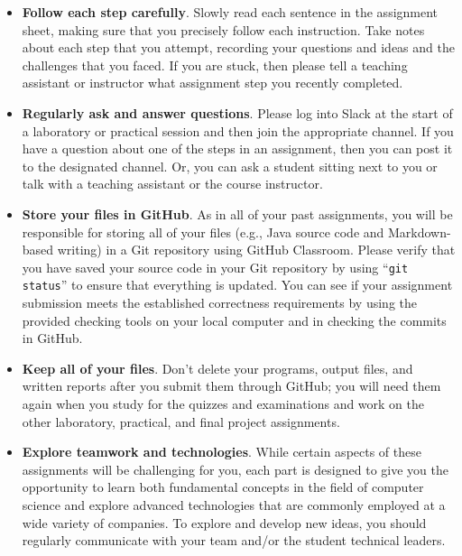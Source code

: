 \documentclass[11pt]{article}
\newcommand{\command}[1]{``\lstinline{#1}''}
\begin{document}
\begin{itemize}
  \setlength{\itemsep}{0pt}

\item {\bf Follow each step carefully}. Slowly read each sentence in the
  assignment sheet, making sure that you precisely follow each instruction.
  Take notes about each step that you attempt, recording your questions and
  ideas and the challenges that you faced. If you are stuck, then please tell a
  teaching assistant or instructor what assignment step you recently completed.

\item {\bf Regularly ask and answer questions}. Please log into Slack at the
  start of a laboratory or practical session and then join the appropriate
  channel. If you have a question about one of the steps in an assignment, then
  you can post it to the designated channel. Or, you can ask a student sitting
  next to you or talk with a teaching assistant or the course instructor.

\item {\bf Store your files in GitHub}. As in all of your past assignments, you
  will be responsible for storing all of your files (e.g., Java source code and
  Markdown-based writing) in a Git repository using GitHub Classroom. Please
  verify that you have saved your source code in your Git repository by using
  \command{git status} to ensure that everything is updated. You can see if
  your assignment submission meets the established correctness requirements by
  using the provided checking tools on your local computer and in checking the
  commits in GitHub.

\item {\bf Keep all of your files}. Don't delete your programs, output files,
  and written reports after you submit them through GitHub; you will need them
  again when you study for the quizzes and examinations and work on the other
  laboratory, practical, and final project assignments.

\item {\bf Explore teamwork and technologies}. While certain aspects of these
  assignments will be challenging for you, each part is designed to give you the
  opportunity to learn both fundamental concepts in the field of computer
  science and explore advanced technologies that are commonly employed at a wide
  variety of companies. To explore and develop new ideas, you should regularly
  communicate with your team and/or the student technical leaders.


\end{itemize}
\end{document}
